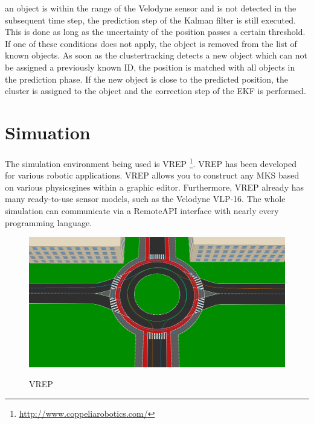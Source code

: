 \documentclass[11pt,oneside,openright]{mpreport}
\begin{document}
an object is within the range of the Velodyne sensor and is not detected in the subsequent time step, the prediction step of the Kalman filter is still executed.
This is done as long as the uncertainty of the position passes a certain  threshold. If one of these conditions does not apply,
the object is removed from the list of known objects. As soon as the clustertracking detects a new object which can not be assigned a previously known ID, 
the position is matched with all objects in the prediction phase. If the new object is close to the predicted position, the cluster is assigned to the object
and the correction step of the EKF is performed.

\chapter{Simuation}

The simulation environment being used is VREP \footnote{\url{http://www.coppeliarobotics.com/}}. VREP has been developed for various robotic applications.
VREP allows you to construct any \ac{MKS} based on various physicsgines within a graphic editor. Furthermore, VREP already has many ready-to-use sensor models, such as
the Velodyne VLP-16. The whole simulation can communicate via a RemoteAPI interface with nearly every programming language.

\begin{figure}[!ht]
\caption{VREP}
\includegraphics[width=\textwidth]{bilder/path.png}
\label{vrep}
\end{figure}
\end{document}

